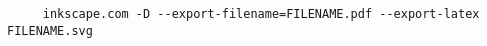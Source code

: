 \begin{verbatim}
     inkscape.com -D --export-filename=FILENAME.pdf --export-latex FILENAME.svg
\end{verbatim}


\begin{center}
    \def\svgwidth{0.7\columnwidth}
    
    \label{fig:pointwise}
\end{center}


